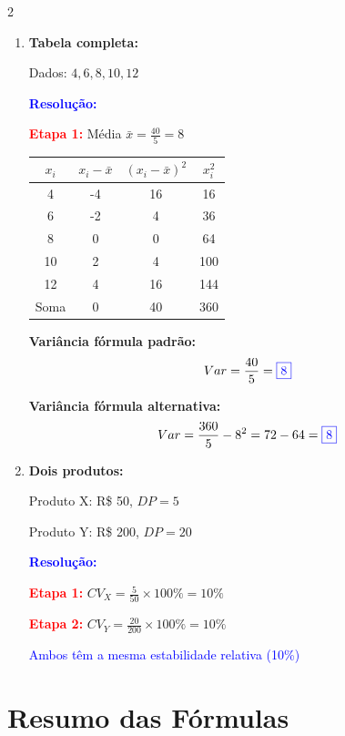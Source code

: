 \documentclass[11pt]{article}
\newcommand{\respostaNum}[1]{\textcolor{blue}{\boxed{#1}}}
\newcommand{\respostaTxt}[1]{\textcolor{blue}{#1}}
\newcommand{\resolucao}{\textbf{\textcolor{blue}{Resolução:}}}
\begin{document}
\begin{multicols}{2}
\begin{enumerate}[leftmargin=*, start=11]
\begin{enumerate}[label=\alph*)]
\respostaTxt{Alta dispersão (CV > 30\%)}
\end{enumerate}

\item \textbf{Tabela completa:}

Dados: $4, 6, 8, 10, 12$

\resolucao

\textbf{\textcolor{red}{Etapa 1:}} Média $\bar{x} = \frac{40}{5} = 8$

\begin{center}
\begin{tabular}{|c|c|c|c|}
\hline
$x_i$ & $x_i - \bar{x}$ & $(x_i - \bar{x})^2$ & $x_i^2$ \\
\hline
4 & -4 & 16 & 16 \\
6 & -2 & 4 & 36 \\
8 & 0 & 0 & 64 \\
10 & 2 & 4 & 100 \\
12 & 4 & 16 & 144 \\
\hline
Soma & 0 & 40 & 360 \\
\hline
\end{tabular}
\end{center}

\textbf{Variância fórmula padrão:}
\[
Var = \frac{40}{5} = \respostaNum{8}
\]

\textbf{Variância fórmula alternativa:}
\[
Var = \frac{360}{5} - 8^2 = 72 - 64 = \respostaNum{8}
\]

\item \textbf{Dois produtos:}

Produto X: R\$ 50, $DP = 5$

Produto Y: R\$ 200, $DP = 20$

\resolucao

\textbf{\textcolor{red}{Etapa 1:}} $CV_X = \frac{5}{50} \times 100\% = 10\%$

\textbf{\textcolor{red}{Etapa 2:}} $CV_Y = \frac{20}{200} \times 100\% = 10\%$

\respostaTxt{Ambos têm a mesma estabilidade relativa (10\%)}
\end{enumerate}

\section*{Resumo das Fórmulas}

\begin{center}


\end{center}
\end{multicols}
\end{document}
